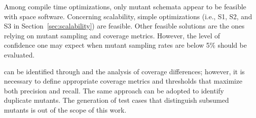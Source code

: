 Among compile time optimizations, only mutant schemata appear to be feasible with space software.
Concerning scalability, simple optimizations (i.e., S1, S2, and S3 in Section~\ref{sec:scalability}) are feasible. Other feasible solutions are the ones relying on mutant sampling and coverage metrics. However, the level of confidence one may expect when mutant sampling rates are below 5\% should be evaluated. 

 can be identified through  and the analysis of coverage differences; however, it is necessary to define appropriate coverage metrics and thresholds that maximize both precision and recall. The same approach can be adopted to identify duplicate mutants. The generation of test cases that distinguish subsumed mutants is out of the scope of this work.



